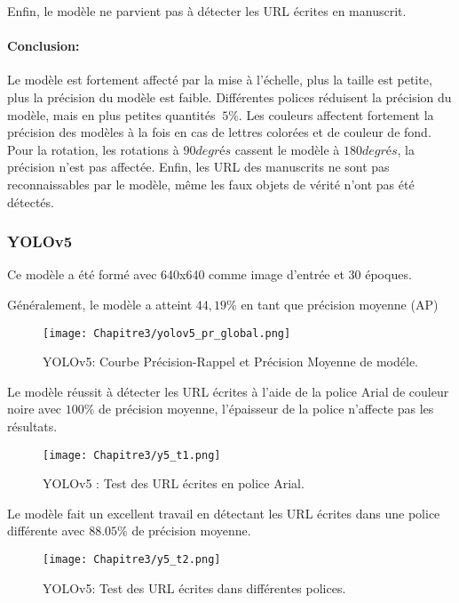           Enfin, le modèle ne parvient pas à détecter les URL écrites en manuscrit.
          \paragraph{Conclusion:} Le modèle est fortement affecté par la mise à l'échelle, plus la taille est petite, plus la précision du modèle est faible. Différentes polices réduisent la précision du modèle, mais en plus petites quantités $~ 5\%$. Les couleurs affectent fortement la précision des modèles à la fois en cas de lettres colorées et de couleur de fond. Pour la rotation, les rotations à $90 degrés$ cassent le modèle à $180 degrés$, la précision n'est pas affectée. Enfin, les URL des manuscrits ne sont pas reconnaissables par le modèle, même les faux objets de vérité n'ont pas été détectés.
               
          \subsubsection{YOLOv5}
          Ce modèle a été formé avec 640x640 comme image d'entrée et 30 époques.
               
          Généralement, le modèle a atteint $44,19\%$ en tant que précision moyenne (AP)
          \begin{figure}[H]
                    \centering
                    \texttt{[image: Chapitre3/yolov5\_pr\_global.png]}
                    \caption{YOLOv5: Courbe Précision-Rappel et Précision Moyenne de modéle.}
                    \label{y4_pr}
                    \end{figure}
               
               
          Le modèle réussit à détecter les URL écrites à l'aide de la police Arial de couleur noire avec $100\%$ de précision moyenne, l'épaisseur de la police n'affecte pas les résultats. 
          \begin{figure}[H]
                    \centering
                    \texttt{[image: Chapitre3/y5\_t1.png]}
                    \caption{YOLOv5 : Test des URL écrites en police Arial.}
                    \label{y5_t1}
                    \end{figure}

          Le modèle fait un excellent travail en détectant les URL écrites dans une police différente avec $88.05\%$ de précision moyenne.
          \begin{figure}[H]
                    \centering
                    \texttt{[image: Chapitre3/y5\_t2.png]}
                    \caption{YOLOv5: Test des URL écrites dans différentes polices.}
                    \label{y5_t2}
                    \end{figure}

